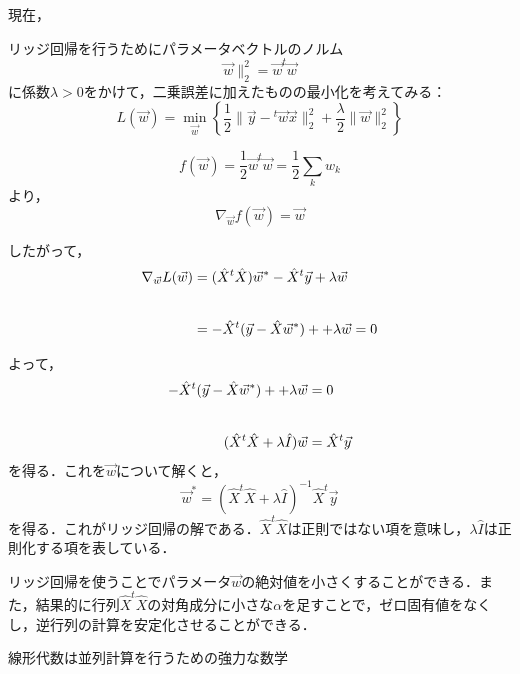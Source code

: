 現在，

リッジ回帰を行うためにパラメータベクトルのノルム
\begin{equation}
    \vec{w}\|^2_2 = \vec{w}^t\vec{w}
\end{equation}
に係数$\lambda > 0$をかけて，二乗誤差に加えたものの最小化を考えてみる：
\begin{equation}
    L(\vec{w}) =
    \min_{\vec{w}}
    \left\{
        \frac{1}{2}\|\vec{y}-{}^t\vec{w}\vec{x}\|^2_2 + \frac{\lambda}{2}\|\vec{w}\|^2_2
    \right\}
\end{equation}


\begin{equation}
    f(\vec{w}) = \frac{1}{2}\vec{w}^t\vec{w}
    = \frac{1}{2}\sum_k w_k
\end{equation}
より，
\begin{equation}
    \nabla_{\vec{w}}f(\vec{w}) = \vec{w}
\end{equation}

したがって，
\begin{align}
    \nabla_{\vec{w}}L(\vec{w})
    & = (\hat{X}^t\hat{X})\vec{w}^\ast 
    - \hat{X}^t\vec{y}
    +\lambda\vec{w}\notag \\\\[5pt]
    & = -\hat{X}^t (\vec{y} - \hat{X}\vec{w}^\ast)
    + +\lambda\vec{w} = 0
\end{align}

よって，
\begin{align}
    -\hat{X}^t (\vec{y} - \hat{X}\vec{w}^\ast)
    + +\lambda\vec{w} &= 0\notag \\\\[5pt]
    (\hat{X}^t\hat{X}
     +\lambda\hat{I})\vec{w} &= \hat{X}^t \vec{y}
\end{align}
を得る．これを$\vec{w}$について解くと，
\begin{equation}
    \vec{w}^\ast = (\hat{X}^t\hat{X}
    +\lambda\hat{I})^{-1}\hat{X}^t \vec{y}
\end{equation}
を得る．これがリッジ回帰の解である．$\hat{X}^t\hat{X}$は正則ではない項を意味し，$\lambda\hat{I}$は正則化する項を表している．

リッジ回帰を使うことでパラメータ$\vec{w}$の絶対値を小さくすることができる．また，結果的に行列$\hat{X}^t\hat{X}$の対角成分に小さな$\alpha$を足すことで，ゼロ固有値をなくし，逆行列の計算を安定化させることができる．

線形代数は並列計算を行うための強力な数学


